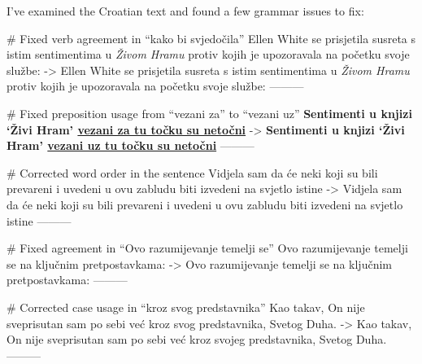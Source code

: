I've examined the Croatian text and found a few grammar issues to fix:

# Fixed verb agreement in “kako bi svjedočila”
Ellen White se prisjetila susreta s istim sentimentima u \textit{Živom Hramu} protiv kojih je upozoravala na početku svoje službe:
->
Ellen White se prisjetila susreta s istim sentimentima u \textit{Živom Hramu} protiv kojih je upozoravala na početku svoje službe:
---------

# Fixed preposition usage from “vezani za” to “vezani uz”
\textbf{Sentimenti u knjizi ‘Živi Hram’ \underline{vezani za tu točku su netočni}}
->
\textbf{Sentimenti u knjizi ‘Živi Hram’ \underline{vezani uz tu točku su netočni}}
---------

# Corrected word order in the sentence
Vidjela sam da će neki koji su bili prevareni i uvedeni u ovu zabludu biti izvedeni na svjetlo istine
->
Vidjela sam da će neki koji su bili prevareni i uvedeni u ovu zabludu biti izvedeni na svjetlo istine
---------

# Fixed agreement in “Ovo razumijevanje temelji se”
Ovo razumijevanje temelji se na ključnim pretpostavkama:
->
Ovo razumijevanje temelji se na ključnim pretpostavkama:
---------

# Corrected case usage in “kroz svog predstavnika”
Kao takav, On nije sveprisutan sam po sebi već kroz svog predstavnika, Svetog Duha.
->
Kao takav, On nije sveprisutan sam po sebi već kroz svojeg predstavnika, Svetog Duha.
---------